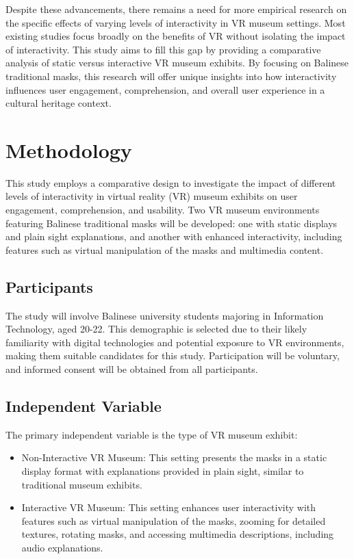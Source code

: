 \documentclass[conference]{IEEEtran}
\begin{document}
Despite these advancements, there remains a need for more empirical research on the specific effects of varying levels of interactivity in VR museum settings. Most existing studies focus broadly on the benefits of VR without isolating the impact of interactivity. This study aims to fill this gap by providing a comparative analysis of static versus interactive VR museum exhibits. By focusing on Balinese traditional masks, this research will offer unique insights into how interactivity influences user engagement, comprehension, and overall user experience in a cultural heritage context.

\section{Methodology}

This study employs a comparative design to investigate the impact of different levels of interactivity in virtual reality (VR) museum exhibits on user engagement, comprehension, and usability. Two VR museum environments featuring Balinese traditional masks will be developed: one with static displays and plain sight explanations, and another with enhanced interactivity, including features such as virtual manipulation of the masks and multimedia content.

\subsection{Participants}
The study will involve Balinese university students majoring in Information Technology, aged 20-22. This demographic is selected due to their likely familiarity with digital technologies and potential exposure to VR environments, making them suitable candidates for this study. Participation will be voluntary, and informed consent will be obtained from all participants.

\subsection{Independent Variable}
The primary independent variable is the type of VR museum exhibit:
\begin{itemize}
\item Non-Interactive VR Museum: This setting presents the masks in a static display format with explanations provided in plain sight, similar to traditional museum exhibits.
\item Interactive VR Museum: This setting enhances user interactivity with features such as virtual manipulation of the masks, zooming for detailed textures, rotating masks, and accessing multimedia descriptions, including audio explanations.
\end{itemize}
\end{document}
